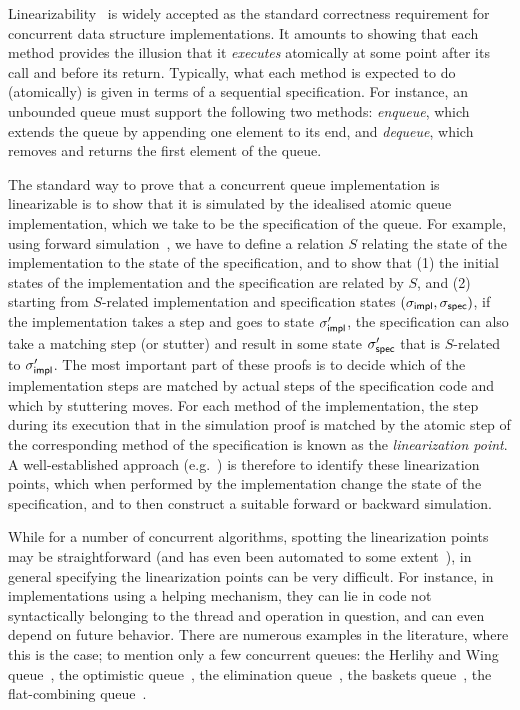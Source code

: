 \documentclass{LMCS}
\begin{document}
Linearizability~\cite{HW1990} is widely accepted as the standard correctness
requirement for concurrent data structure implementations.
It amounts to showing that each method provides the illusion that it {\em executes} atomically at some point after its call and before its return.
Typically, what each method is expected to do (atomically) is given in terms of a sequential specification.
For instance, an unbounded queue must support the following two methods: 
\emph{enqueue}, which extends the queue by appending one element to its end, 
and \emph{dequeue}, which removes and returns the first element of the queue.

The standard way to prove that a concurrent queue implementation is linearizable is
to show that it is simulated by the idealised atomic queue implementation, 
which we take to be the specification of the queue.
For example, using forward simulation~\cite{LV1995}, we have to define 
a relation $S$ relating the state of the implementation to the state of the specification,
and to show that 
(1) the initial states of the implementation and the specification are related by $S$, and 
(2) starting from $S$-related implementation and specification states $(\sigma_{\sf impl}, \sigma_{\sf spec})$, 
if the implementation takes a step and goes to state $\sigma'_{\sf impl}$, 
the specification can also take a matching step (or stutter) and 
result in some state $\sigma'_{\sf spec}$ that is $S$-related to $\sigma'_{\sf impl}$.
The most important part of these proofs is to decide which of the implementation steps
are matched by actual steps of the specification code and which by stuttering moves.
For each method of the implementation, the step during its execution that in the 
simulation proof is matched by the atomic step of the corresponding method of the 
specification is known as the \emph{linearization point}.
A well-established approach (e.g.~\cite{AHH+2013,ARR+2007,CDG2005,DSW2011,DM2009,LCL+2009,SWD2012,Vaf2009,Vaf2010})
is therefore to identify these linearization points, 
which when performed by the implementation change the state of the specification, 
and to then construct a suitable forward or backward simulation.

While for a number of concurrent algorithms, spotting the
linearization points may be straightforward (and has even been automated to some extent~\cite{Vaf2010}), 
in general specifying the linearization points can be very difficult. 
For instance, in implementations using a helping mechanism, they can lie in code not syntactically belonging to the thread and operation in question, and can even depend on future behavior.
There are numerous examples in the literature, where this is the case;
to mention only a few concurrent queues: 
the Herlihy and Wing queue~\cite{HW1990},
the optimistic queue~\cite{LS2004}, 
the elimination queue~\cite{MNS+2005}, 
the baskets queue~\cite{HSS2007}, 
the flat-combining queue~\cite{HIS+2010}.
\end{document}
